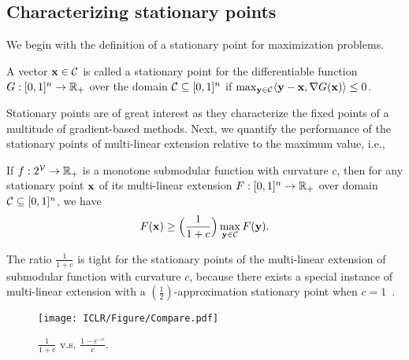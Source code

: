 	\subsection{Characterizing stationary points}
	We begin with the definition of a stationary point for maximization problems.
	\begin{definition}A vector $\mathbf{x}\in\mathcal{C}$ is called a stationary point for the differentiable function $G: [0,1]^{n}\rightarrow\mathbb{R}_{+}$ over the domain $\mathcal{C}\subseteq[0,1]^{n}$ if $\max_{\mathbf{y}\in\mathcal{C}}\langle\mathbf{y}-\mathbf{x},\nabla G(\mathbf{x})\rangle\le 0$.
	\end{definition}
Stationary points are of great interest as they characterize the fixed points of a multitude of gradient-based methods. Next, we quantify the performance of the stationary points of multi-linear extension relative to the maximum value, i.e., 
	\begin{theorem}\label{thm:1} If $f:2^{\mathcal{V}}\rightarrow\mathbb{R}_{+}$ is a monotone submodular function with curvature $c$, then for any stationary point $\mathbf{x}$ of its multi-linear extension $F:[0,1]^{n}\rightarrow\mathbb{R}_{+}$ over domain $\mathcal{C}\subseteq[0,1]^{n}$, we have
	\begin{equation*}
			F(\mathbf{x})\ge\Big(\frac{1}{1+c}\Big)\max_{\mathbf{y}\in\mathcal{C}}F(\mathbf{y}).
		\end{equation*}
	\end{theorem}
	\begin{remark}
		The ratio $\frac{1}{1+c}$ is tight for the stationary points of the multi-linear extension of submodular function with curvature $c$, because there exists a special instance of multi-linear extension with a $(\frac{1}{2})$-approximation stationary point when $c=1$~\citep{hassani2017gradient}.
  	\end{remark}
  		\begin{wrapfigure}{r}{0.24\textwidth}
      \texttt{[image: ICLR/Figure/Compare.pdf]}
  		\captionsetup{font=scriptsize}
  		\caption{$\frac{1}{1+c}$ v.s. $\frac{1-e^{-c}}{c}$.}\label{figure:2}
 		\vspace{-1.0em}
  	\end{wrapfigure}
